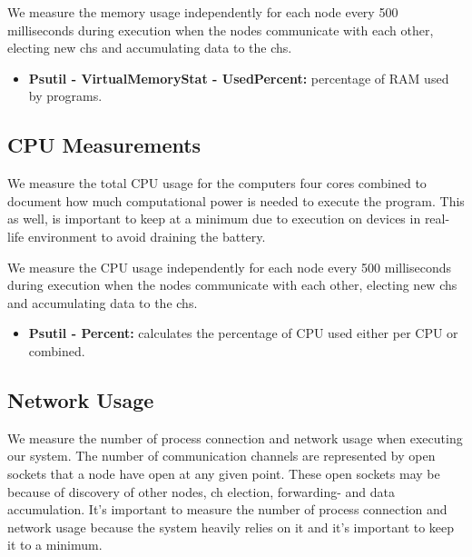 \documentclass[USenglish]{uit-thesis}
\begin{document}

We measure the memory usage independently for each node every 500 milliseconds during execution when the nodes communicate with each other, electing new \glspl{ch} and accumulating data to the \glspl{ch}.

\begin{itemize}
\item \textbf{Psutil - VirtualMemoryStat - UsedPercent:} percentage of RAM used by programs.
\end{itemize}


\subsection{CPU Measurements} \label{eva:cpu_measure}
We measure the total CPU usage for the computers four cores combined to document how much computational power is needed to execute the program. This as well, is important to keep at a minimum due to execution on devices in real-life environment to avoid draining the battery.

We measure the CPU usage independently for each node every 500 milliseconds during execution when the nodes communicate with each other, electing new \glspl{ch} and accumulating data to the \glspl{ch}.

\begin{itemize}
\item \textbf{Psutil - Percent:} calculates the percentage of CPU used either per CPU or combined.
\end{itemize}


\subsection{Network Usage} \label{eva:net_measure}
We measure the number of process connection and network usage when executing our system. The number of communication channels are represented by open sockets that a node have open at any given point. These open sockets may be because of discovery of other nodes, \gls{ch} election, forwarding- and data accumulation. It's important to measure the number of process connection and network usage because the system heavily relies on it and it's important to keep it to a minimum.

\end{document}
